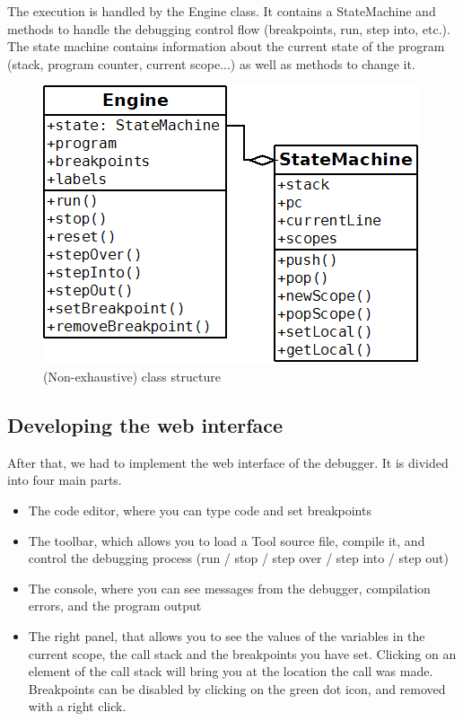 The execution is handled by the Engine class. It contains a StateMachine and methods to handle the debugging control flow (breakpoints, run, step into, etc.).
The state machine contains information about the current state of the program (stack, program counter, current scope...) as well as methods to change it.\\

\begin{figure}[h]
  \centering
    \includegraphics[scale=0.6]{diag.png}
     \caption{(Non-exhaustive) class structure}
\end{figure}

\subsection{Developing the web interface}

After that, we had to implement the web interface of the debugger. It is divided into four main parts.

\begin{itemize}
\item The code editor, where you can type code and set breakpoints
\item The toolbar, which allows you to load a Tool source file, compile it, and control the debugging process (run / stop / step over / step into / step out)
\item The console, where you can see messages from the debugger, compilation errors, and the program output
\item The right panel, that allows you to see the values of the variables in the current scope, the call stack and the breakpoints you have set. Clicking on an element of the call stack will bring you at the location the call was made. Breakpoints can be disabled by clicking on the green dot icon, and removed with a right click.
\end{itemize}

